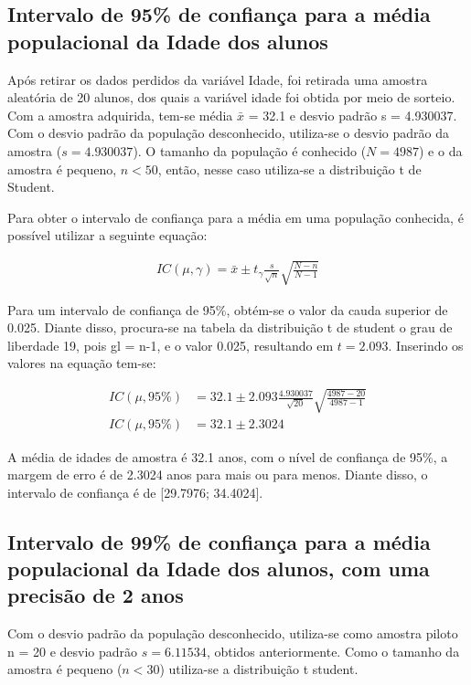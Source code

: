\subsection{Intervalo de 95\% de confiança para a média populacional da Idade dos alunos}
\label{sub:1a}
	
	Após retirar os dados perdidos da variável Idade, foi retirada uma
	amostra aleatória de 20 alunos, dos quais a variável idade foi obtida por meio de sorteio. Com a amostra
	adquirida, tem-se média $\bar{x}$ = \num{32,1} e desvio padrão s = \num{4,930037}.
	Com o desvio padrão da população desconhecido, utiliza-se o desvio
	padrão da amostra ($s = \num{4,930037}$).  O tamanho da população é conhecido ($N
	= 4987$) e o da amostra é pequeno, $n < 50$, então, nesse caso utiliza-se
	a distribuição t de Student.

	Para obter o intervalo de confiança para a média em uma população
	conhecida, é possível utilizar a seguinte equação:

	
	\begin{align}
		\label{eq:dois-a-expr}
		IC (\mu, \gamma) = \bar{x} \pm t_\gamma \frac{s}{\sqrt{n}} \sqrt{\frac{N-n}{N-1}}
	\end{align}

	Para um intervalo de confiança de 95\%, obtém-se o valor da cauda
	superior de \num{0,025}. Diante disso, procura-se na tabela da distribuição
	t de student o grau de liberdade 19, pois gl = n-1, e o valor \num{0,025},
	resultando em $t = \num{2,093}$. Inserindo os valores na equação
	tem-se:

	\begin{align*}
		IC (\mu, 95\%) &= \num{32,1} \pm \num{2,093} \frac{\num{4,930037}}{\sqrt{20}} \sqrt{\frac{4987 - 20}{4987 - 1}} \\
		IC (\mu, 95\%) &= \num{32,1} \pm \num{2,3024}
	\end{align*}

	A média de idades de amostra é \num{32,1} anos, com o nível de confiança de
	95\%, a margem de erro é de \num{2,3024} anos para mais ou para menos. Diante
	disso, o intervalo de confiança é de [\num{29,7976}; \num{34,4024}].

\subsection{Intervalo de 99\% de confiança para a média populacional da Idade dos alunos, com uma precisão de 2 anos}

	Com o desvio padrão da população desconhecido, utiliza-se como amostra
	piloto n = 20 e desvio padrão $s = \num{6,11534}$, obtidos anteriormente. Como o
	tamanho da amostra é pequeno ($n < 30$) utiliza-se a
	distribuição t student.

